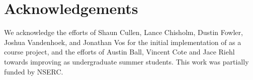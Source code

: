 \section{Acknowledgements}
We acknowledge the efforts of Shaun Cullen, Lance Chisholm, Dustin Fowler, Joshua Vandenhoek, and Jonathan Vos for the initial implementation of \pwOne as a course project, and the efforts of Austin Ball, Vincent Cote and Jace Riehl towards improving \pwOne as undergraduate summer students. This work was partially funded by NSERC.
